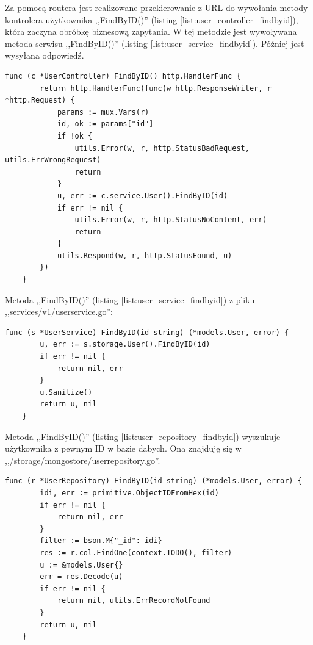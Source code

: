 Za pomocą routera jest realizowane przekierowanie z URL do wywołania metody kontrolera użytkownika ,,FindByID()'' (listing \ref{list:user_controller_findbyid}), która zaczyna obróbkę biznesową zapytania.
W tej metodzie jest wywoływana metoda serwisu ,,FindByID()'' (listing \ref{list:user_service_findbyid}). Później jest wysyłana odpowiedź.
\begin{lstlisting}[label=list:user_controller_findbyid,caption=Kontroler wczytywania użytkownika,basicstyle=\tiny\ttfamily]
    func (c *UserController) FindByID() http.HandlerFunc {
        return http.HandlerFunc(func(w http.ResponseWriter, r *http.Request) {
            params := mux.Vars(r)
            id, ok := params["id"]
            if !ok {
                utils.Error(w, r, http.StatusBadRequest, utils.ErrWrongRequest)
                return
            }
            u, err := c.service.User().FindByID(id)
            if err != nil {
                utils.Error(w, r, http.StatusNoContent, err)
                return
            }
            utils.Respond(w, r, http.StatusFound, u)
        })
    }
\end{lstlisting}
% 
Metoda ,,FindByID()'' (listing \ref{list:user_service_findbyid}) z pliku ,,services/v1/userservice.go'':
\begin{lstlisting}[label=list:user_service_findbyid,caption=Serwis wczytywania użytkownika,basicstyle=\tiny\ttfamily]
    func (s *UserService) FindByID(id string) (*models.User, error) {
        u, err := s.storage.User().FindByID(id)
        if err != nil {
            return nil, err
        }
        u.Sanitize()
        return u, nil
    }
\end{lstlisting}
% 
Metoda ,,FindByID()'' (listing \ref{list:user_repository_findbyid}) wyszukuje użytkownika z pewnym ID w bazie dabych.
Ona znajduję się w ,,/storage/mongostore/userrepository.go''.
\begin{lstlisting}[label=list:user_repository_findbyid,caption=Wczytywanie uzytkownika z bazy danych,basicstyle=\tiny\ttfamily]
    func (r *UserRepository) FindByID(id string) (*models.User, error) {
        idi, err := primitive.ObjectIDFromHex(id)
        if err != nil {
            return nil, err
        }
        filter := bson.M{"_id": idi}
        res := r.col.FindOne(context.TODO(), filter)
        u := &models.User{}
        err = res.Decode(u)
        if err != nil {
            return nil, utils.ErrRecordNotFound
        }
        return u, nil
    }
\end{lstlisting}

% 
